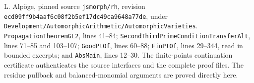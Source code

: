 L. Alp\"oge, pinned source \texttt{jsmorph/rh}, revision
\texttt{ecd09ff9b4aaf6c08f2b5ef17dc49ca9648a77de}, under
\texttt{Development/AutomorphicArithmetic/AutomorphicVarieties}.
\texttt{PropagationTheoremGL2}, lines 41--84;
\texttt{SecondThirdPrimeConditionTransferAlt}, lines 71--85 and 103--107;
\texttt{GoodPtOf}, lines 60--88;
\texttt{FinPtOf}, lines 29--344, read in bounded excerpts;
and \texttt{AbsMain}, lines 12--30.
The finite-points continuation certificate authenticates the source
interfaces and the complete proof files.  The residue pullback
and balanced-monomial arguments are proved directly here.
